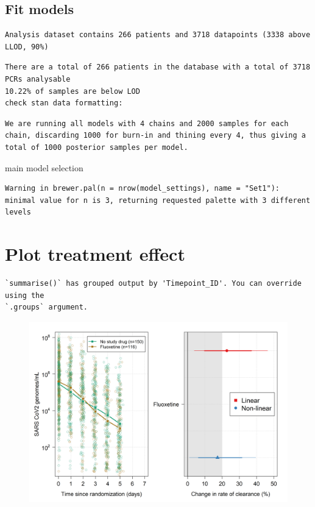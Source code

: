 \documentclass[
  letterpaper,
  DIV=11,
  numbers=noendperiod]{scrartcl}
\begin{document}
\hypertarget{fit-models}{%
\subsection{Fit models}\label{fit-models}}

\begin{verbatim}
Analysis dataset contains 266 patients and 3718 datapoints (3338 above LLOD, 90%)
\end{verbatim}

\begin{verbatim}
There are a total of 266 patients in the database with a total of 3718 PCRs analysable
10.22% of samples are below LOD
check stan data formatting:
\end{verbatim}

\begin{verbatim}
We are running all models with 4 chains and 2000 samples for each chain, discarding 1000 for burn-in and thining every 4, thus giving a total of 1000 posterior samples per model.
\end{verbatim}

main model selection

\begin{verbatim}
Warning in brewer.pal(n = nrow(model_settings), name = "Set1"): minimal value for n is 3, returning requested palette with 3 different levels
\end{verbatim}

\hypertarget{plot-treatment-effect}{%
\section{Plot treatment effect}\label{plot-treatment-effect}}

\begin{verbatim}
`summarise()` has grouped output by 'Timepoint_ID'. You can override using the
`.groups` argument.
\end{verbatim}

\begin{figure}[H]

{\centering \includegraphics{Fluoxetine_analysis_files/figure-pdf/Figure_main-1.png}

}

\end{figure}
\end{document}
